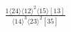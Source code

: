 \documentclass[varwidth, border=5pt]{standalone}
\begin{document}
\begin{my}
$\begin{gathered}
\scriptscriptstyle\frac{1⟨24⟩⟨12⟩^2⟨15⟩[13]}{⟨14⟩^3⟨23⟩^2[35]}
\end{gathered}$
\end{my}
\end{document}
